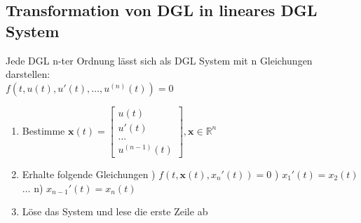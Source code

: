 \documentclass[6pt,a4paper]{scrartcl}
\newcommand{\mat}[1]{\ensuremath{\begin{bmatrix} #1 \end{bmatrix}}}                             %
\newcommand{\vect}[1]{\ensuremath{\begin{pmatrix} #1 \end{pmatrix}}}                            %
\renewcommand{\vec}[1]{\ensuremath{\boldsymbol {#1}}}                                           %
\newcommand{\diff}{\ensuremath{\;\mathrm d}}                                   %
\newcommand{\R}{\ensuremath{\mathbb R}}
\begin{document}
\begin{multicols*}{4}

    \subsection{Transformation von DGL in lineares DGL System}
    Jede DGL n-ter Ordnung lässt sich als DGL System mit n Gleichungen darstellen:\\
    $\boxed{f(t, u(t), u'(t),\hdots , u^{(n)}(t)) = 0}$\\
    \begin{enumerate}
        \item Bestimme $\vec x(t) = \mat{u(t) \\ u'(t) \\ \hdots \\ u^{(n-1)}(t)}, \vec x \in \R^n$
        \item Erhalte folgende Gleichungen
              ) $f(t, \vec x(t), x_n'(t)) = 0$
              ) $x_1'(t) = x_2(t)$
              \subitem $\hdots$
              \subitem n) $x_{n-1}'(t) = x_n(t)$
        \item Löse das System und lese die erste Zeile ab
    \end{enumerate}


\end{multicols*}
\end{document}

